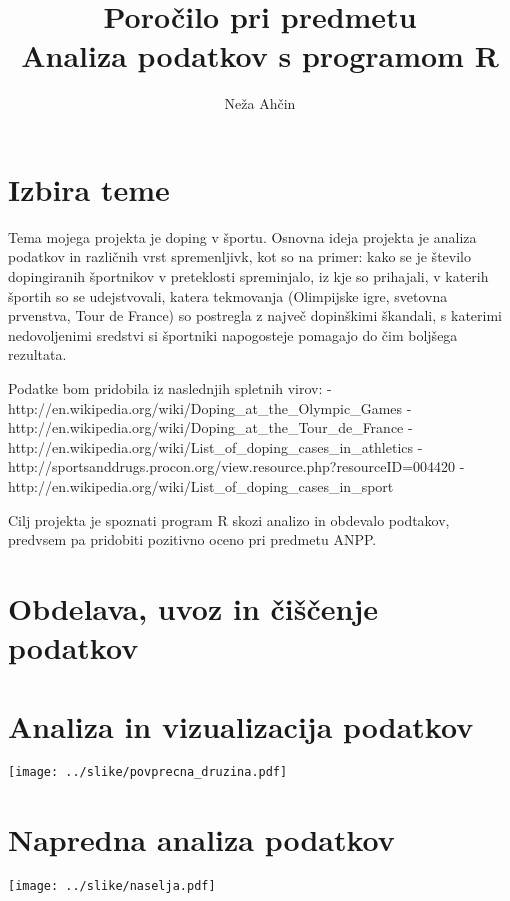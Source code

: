 \documentclass[11pt,a4paper]{article}
\begin{document}
\title{Poročilo pri predmetu \\
Analiza podatkov s programom R}
\author{Neža Ahčin}
\maketitle

\section{Izbira teme}
Tema mojega projekta je doping v športu. Osnovna ideja projekta je analiza podatkov in različnih vrst spremenljivk, kot so na primer: kako se je število dopingiranih športnikov v preteklosti spreminjalo, iz kje so prihajali, v katerih športih so se udejstvovali, katera tekmovanja (Olimpijske igre, svetovna prvenstva, Tour de France) so postregla z največ dopinškimi škandali, s katerimi nedovoljenimi sredstvi si športniki napogosteje pomagajo do čim boljšega rezultata.

Podatke bom pridobila iz naslednjih spletnih virov:
- http://en.wikipedia.org/wiki/Doping_at_the_Olympic_Games
- http://en.wikipedia.org/wiki/Doping_at_the_Tour_de_France
- http://en.wikipedia.org/wiki/List_of_doping_cases_in_athletics
- http://sportsanddrugs.procon.org/view.resource.php?resourceID=004420
- http://en.wikipedia.org/wiki/List_of_doping_cases_in_sport

Cilj projekta je spoznati program R skozi analizo in obdevalo podtakov, predvsem pa pridobiti pozitivno oceno pri predmetu ANPP.

\section{Obdelava, uvoz in čiščenje podatkov}

\section{Analiza in vizualizacija podatkov}

\texttt{[image: ../slike/povprecna\_druzina.pdf]}

\section{Napredna analiza podatkov}

\texttt{[image: ../slike/naselja.pdf]}
\end{document}
